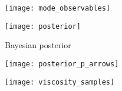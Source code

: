 \documentclass[aps,prc,reprint,amsmath]{revtex4-1}
\begin{document}
\begin{figure*}
    \texttt{[image: mode\_observables]}
\end{figure*}

\begin{figure*}
    \texttt{[image: posterior]}
    \caption{Bayesian posterior}
\end{figure*}

\begin{figure}
    \centering
    \texttt{[image: posterior\_p\_arrows]}
\end{figure}

\begin{figure}
    \texttt{[image: viscosity\_samples]}
\end{figure}


\end{document}
